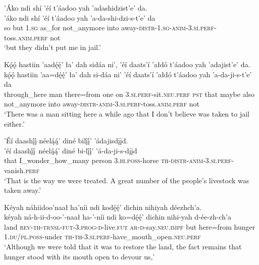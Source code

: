 \ea\label{ex:text7-15-3}
’Áko ndi shí ’éí t’áadoo yah ’adashidzist’e’ da.\\
\gll ’áko	ndi	shí	’éí	t’áadoo	yah	’a-da-shi-dzi-s-t’e’	da\\
     so	but	1.\textsc{sg}	as\_for	not\_anymore	into	away-\textsc{distr}-1.\textsc{sg}-\textsc{anim}-3.\textsc{si}.\textsc{perf}-toss.\textsc{anim}.\textsc{perf}	not\\
\glt `but they didn't put me in jail.'
\z

\ea\label{ex:text7-15-4}
Kǫ́ǫ́ hastiin ’aadę́ę́’ ła’ dah sidáa ni’, ’éí daats’í ’ałdó t’áadoo yah ’adajist’e’ da.\\
\gll kǫ́ǫ́	hastiin	’aa=dę́ę́’	ła’	dah	si-dáa	ni’	’éí	daats’í	’ałdó	t’áadoo	yah	’a-da-ji-s-t’e’	da\\
     through\_here	man	there=from	one	on	3.\textsc{si}.\textsc{perf}-sit.\textsc{neu}.\textsc{perf}	\textsc{pst}	that	maybe	also	not\_anymore	into	away-\textsc{distr}-\textsc{anim}-3.\textsc{si}.\textsc{perf}-toss.\textsc{anim}.\textsc{perf}	not\\
\glt `There was a man sitting here a while ago that I don't believe was taken to jail either.'
\z

\ea\label{ex:text7-15-5}
’Éí daashį́į́ néelą́ą́’ diné bilį́į́’ ’ádajisdįįd.\\
\gll ’éí	daashį́į́~{néelą́ą́’}	diné	bi-lį́į́’	’á-da-ji-s-dįįd\\
     that	I\_wonder\_how\_many	person	3.\textsc{bi}.\textsc{poss}-horse	\textsc{th}-\textsc{distr}-\textsc{anim}-3.\textsc{si}.\textsc{perf}-vanish.\textsc{perf}\\
\glt `That is the way we were treated. A great number of the people's livestock was taken away.'
\z

\newpage
\ea\label{ex:text7-15-6}
Kéyah náhiidoo’naał ha’níi ndi kodę́ę́’ dichin nihiyah déezhch’a.\\
\gll kéyah	ná-h-ii-d-oo-’-naał	ha-’-níi	ndi	ko=dę́ę́’	dichin	nihi-yah	d-ée-zh-ch’a\\
     land	\textsc{rev}-\textsc{th}-\textsc{trnsl}-\textsc{fut}-3.\textsc{prog}-\textsc{d}-live.\textsc{fut}	\textsc{ar}-\textsc{d}-say.\textsc{neu}.\textsc{impf}	but	here=from	hunger	1.\textsc{du}/\textsc{pl}.\textsc{poss}-under	\textsc{th}-\textsc{th}-3.\textsc{si}.\textsc{perf}-have\_mouth\_open.\textsc{neu}.\textsc{perf}\\
\glt `Although we were told that it was to restore the land, the fact remains that hunger stood with its mouth open to devour us,'
\z


